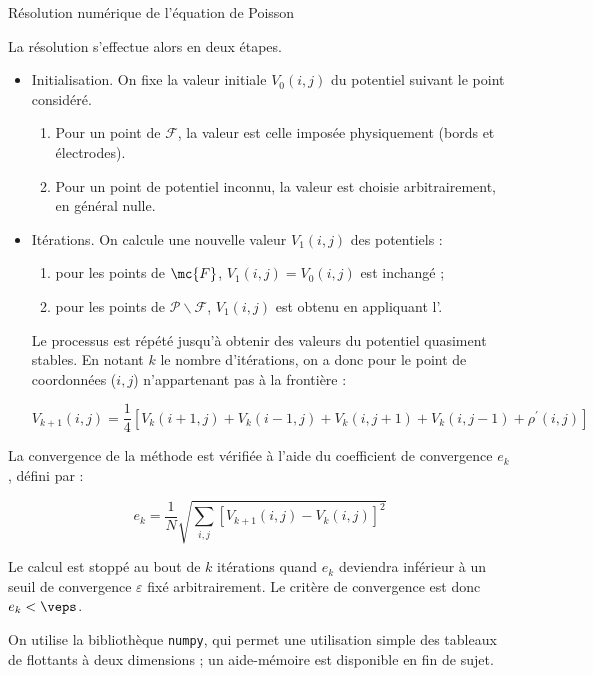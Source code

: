 \begin{exo}[PC][2][devoir]{Résolution numérique de l’équation de Poisson}
{La résolution s'effectue alors en deux étapes.
\begin{itemize}
  \item 
  Initialisation. On fixe la valeur initiale  $V_0(i, j)$ du potentiel suivant le point considéré.
  \begin{enumerate}
    \item 
     Pour un point de $\mathcal{F}$, la valeur  est celle imposée physiquement (bords et électrodes).
    \item Pour un point de potentiel inconnu, la valeur est choisie arbitrairement, en général nulle.
  \end{enumerate}
  \item Itérations. 
  On calcule une nouvelle valeur $V_1(i, j)$ des potentiels :
  \begin{enumerate}
    \item pour les points de $\mc{F}$, $V_1(i,j) = V_0(i,j)$ est inchangé ;
    \item pour les points de $\mathcal{P} \backslash \mathcal{F}$, $V_1(i,j)$ est obtenu en appliquant l'.
  \end{enumerate}
  Le processus est répété jusqu'à obtenir des valeurs du potentiel quasiment stables. En notant $k$ le nombre d'itérations, on a donc pour le point de coordonnées ($i, j$) n'appartenant pas à la frontière :
  
  \begin{equation}
    V_{k+1}(i, j)=\frac{1}{4}\left[V_k(i+1, j)+V_k(i-1, j)+V_k(i, j+1)+V_k(i, j-1)+\rho^{\prime }(i, j)\right]
  \end{equation}
\end{itemize}


La convergence de la méthode est vérifiée à l'aide du coefficient de convergence $e_k$, défini par :

\begin{equation}\label{eq:convergence}
  e_k=\frac{1}{N} \sqrt{\sum_{i, j}\left[V_{k+1}(i, j)-V_k(i, j)\right]^2}
\end{equation}


Le calcul est stoppé au bout de $k$ itérations quand $e_k$ deviendra inférieur à un seuil de convergence $\varepsilon$ fixé arbitrairement. Le critère de convergence est donc $e_k < \veps$.

On utilise la bibliothèque \texttt{numpy}, qui permet une utilisation simple des tableaux de flottants à deux dimensions ; un aide-mémoire est disponible en fin de sujet.

}
\end{exo}
